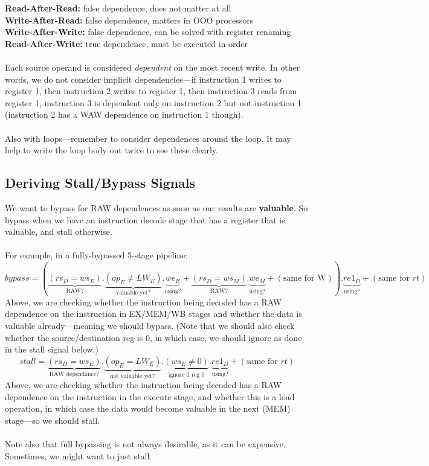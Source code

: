 \documentclass{article}
\begin{document}
\textbf{Read-After-Read:} false dependence, does not matter at all \\
\textbf{Write-After-Read:} false dependence, matters in OOO processors \\
\textbf{Write-After-Write:} false dependence, can be solved with register renaming \\
\textbf{Read-After-Write:} true dependence, must be executed in-order \\
\\
Each source operand is considered \textit{dependent} on the most recent write. In other words, we do not consider implicit dependencies---if instruction 1 writes to register 1, then instruction 2 writes to register 1, then instruction 3 reads from register 1, instruction 3 is dependent only on instruction 2 but not instruction 1 (instruction 2 has a WAW dependence on instruction 1 though). \\
\\
Also with loops---remember to consider dependences around the loop. It may help to write the loop body out twice to see these clearly.

\subsection{Deriving Stall/Bypass Signals}

We want to bypass for RAW dependences as soon as our results are \textbf{valuable}. So bypass when we have an instruction decode stage that has a register that is valuable, and stall otherwise. \\
\\
For example, in a fully-bypassed 5-stage pipeline:
$$ bypass = \left(\underbrace{(rs_D=ws_E)}_{\text{RAW?}}. \underbrace{(op_E \neq LW_E)}_{\text{valuable yet?}}.\underbrace{we_E}_{\text{using?}} + \underbrace{(rs_D=ws_M)}_{\text{RAW?}}.\underbrace{we_M}_{\text{using?}} + (\text{same for W}) \right).\underbrace{re1_D}_{\text{using?}} + (\text{same for } rt) $$
Above, we are checking whether the instruction being decoded has a RAW dependence on the instruction in EX/MEM/WB stages and whether the data is valuable already---meaning we should bypass. (Note that we should also check whether the source/destination reg is 0, in which case, we should ignore as done in the stall signal below.) 
$$ stall = \underbrace{(rs_D=ws_E)}_{\text{RAW dependance?}}. \underbrace{(op_E=LW_E)}_{\text{not valuable yet?}}.\underbrace{(ws_E \neq 0 )}_{\text{ignore if reg 0}}.\underbrace{re1_D}_{\text{using?}} + (\text{same for } rt) $$
Above, we are checking whether the instruction being decoded has a RAW dependence on the instruction in the execute stage, and whether this is a load operation, in which case the data would become valuable in the next (MEM) stage---so we should stall. \\
\\
Note also that full bypassing is not always desirable, as it can be expensive. Sometimes, we might want to just stall.
\end{document}

